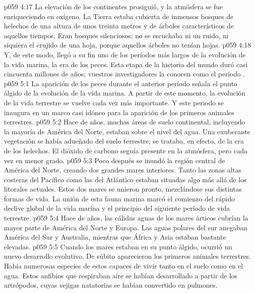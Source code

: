 \vs p059 4:17 \pc La elevación de los continentes prosiguió, y la atmósfera se fue enriqueciendo en oxígeno. La Tierra estaba cubierta de inmensos bosques de helechos de una altura de unos treinta metros y de árboles característicos de aquellos tiempos. Eran bosques silenciosos; no se escuchaba ni un ruido, ni siquiera el crujido de una hoja, porque aquellos árboles no tenían hojas.
\vs p059 4:18 \pc Y, de este modo, llegó a su fin uno de los períodos más largos de la evolución de la vida marina, la era de los peces. Esta etapa de la historia del mundo duró casi cincuenta millones de años; vuestros investigadores la conocen como el período .
\vs p059 5:1 La aparición de los peces durante el anterior período señala el punto álgido de la evolución de la vida marina. A partir de este momento, la evolución de la vida terrestre se vuelve cada vez más importante. Y este periodo se inaugura en un marco casi idóneo para la aparición de los primeros animales terrestres.
\vs p059 5:2 \pc Hace  de años, muchas áreas de suelo continental, incluyendo la mayoría de América del Norte, estaban sobre el nivel del agua. Una exuberante vegetación se había adueñado del suelo terrestre; se trataba, en efecto, de la era de los helechos. El dióxido de carbono seguía presente en la atmósfera, pero cada vez en menor grado.
\vs p059 5:3 Poco después se inundó la región central de América del Norte, creando dos grandes mares interiores. Tanto las zonas altas costeras del Pacífico como las del Atlántico estaban situadas algo más allá de los litorales actuales. Estos dos mares se unieron pronto, mezclándose sus distintas formas de vida. La unión de esta fauna marina marcó el comienzo del rápido declive global de la vida marina y el principio del siguiente período de vida terrestre.
\vs p059 5:4 \pc Hace  de años, las cálidas aguas de los mares árticos cubrían la mayor parte de América del Norte y Europa. Las aguas polares del sur anegaban América del Sur y Australia, mientras que África y Asia estaban bastante elevadas.
\vs p059 5:5 Cuando los mares estaban en su punto álgido, ocurrió  un nuevo desarrollo evolutivo. De súbito aparecieron los primeros animales terrestres. Había numerosas especies de estos capaces de vivir tanto en el suelo como en el agua. Estos anfibios que respiraban aire se habían desarrollado a partir de los artrópodos, cuyas vejigas natatorias se habían convertido en pulmones.
